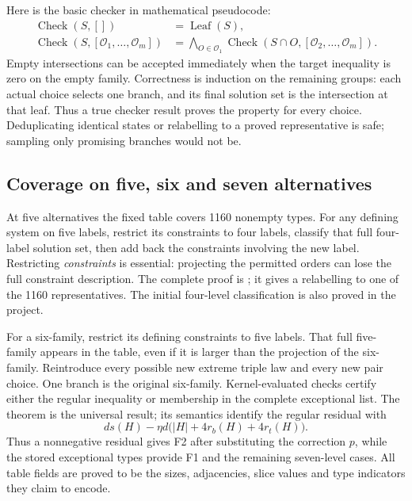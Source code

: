 Here is the basic checker in mathematical pseudocode:
\[
\begin{split}
 \operatorname{Check}(S,[])&=\operatorname{Leaf}(S),\\
 \operatorname{Check}(S,[\mathcal O_1,\ldots,\mathcal O_m])
  &=\bigwedge_{O\in\mathcal O_1}
       \operatorname{Check}(S\cap O,[\mathcal O_2,\ldots,\mathcal O_m]).
\end{split}
\]
Empty intersections can be accepted immediately when the target
inequality is zero on the empty family. Correctness is induction on
the remaining groups: each actual choice selects one branch, and its
final solution set is the intersection at that leaf. Thus a true
checker result proves the property for every choice. Deduplicating
identical states or relabelling to a proved representative is safe;
sampling only promising branches would not be.


\subsection{Coverage on five, six and seven alternatives}
At five alternatives the fixed table covers 1160 nonempty types.
For any defining system on five labels, restrict its constraints to
four labels, classify that full four-label solution set, then add back
the constraints involving the new label. Restricting \emph{constraints}
is essential: projecting the permitted orders can lose the full
constraint description. The complete proof is
; it gives a relabelling to one of the
1160 representatives. The initial four-level classification is also
proved in the project.

For a six-family, restrict its defining constraints to five labels.
That full five-family appears in the table, even if it is larger than
the projection of the six-family. Reintroduce every possible new
extreme triple law and every new pair choice. One branch is the
original six-family. Kernel-evaluated checks certify either the
regular inequality or membership in the complete exceptional list.
The theorem  is the universal result; its
semantics identify the regular residual with
\[
 ds(H)-\eta d\bigl(|H|+4r_b(H)+4r_t(H)\bigr).
\]
Thus a nonnegative residual gives F2 after substituting the correction
\(p\), while the stored exceptional types provide F1 and the remaining
seven-level cases. All table fields are proved to be the sizes,
adjacencies, slice values and type indicators they claim to encode.

